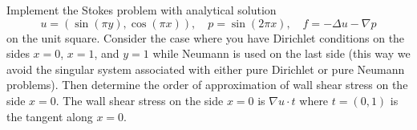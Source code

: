 \begin{exercise}{6.7}
    Implement the Stokes problem with analytical solution
    \begin{equation*}
        u = (\sin(\pi y), \cos(\pi x)),
        \quad p = \sin(2 \pi x),
        \quad f = -\Delta u - \nabla p
    \end{equation*}
    on the unit square.
    Consider the case where you have Dirichlet conditions on the sides $x = 0$, $x = 1$, and $y = 1$ while Neumann is used on the last side (this way we avoid the singular system associated with either pure Dirichlet or pure Neumann problems).
    Then determine the order of approximation of wall shear stress on the side $x = 0$.
    The wall shear stress on the side $x = 0$ is $\nabla u \cdot t$ where $t = (0, 1)$ is the tangent along $x = 0$.
\end{exercise}


